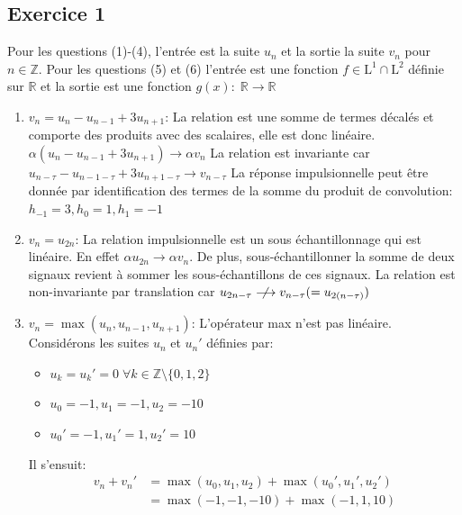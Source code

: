 \subsection*{Exercice 1}
Pour les questions (1)-(4), l'entrée est la suite $u_n$ et la sortie la suite $v_n$ pour $n \in \mathbb{Z}$. \newline
Pour les questions (5) et (6) l'entrée est une fonction $f \in \mathrm{L}^1 \cap \mathrm{L}^2$ définie sur $\mathbb{R}$ et la sortie est une fonction $g(x): \; \mathbb{R} \rightarrow \mathbb{R}$
\begin{enumerate}
\item $v_n = u_n - u_{n-1} + 3u_{n+1}$: \newline
La relation est une somme de termes décalés et comporte des produits avec des scalaires, elle est donc linéaire. $\alpha(u_n - u_{n-1} + 3u_{n+1}) \rightarrow \alpha v_n$ \newline
La relation est invariante car $u_{n-\tau} - u_{n-1-\tau} + 3u_{n+1-\tau} \rightarrow v_{n-\tau}$ \newline
La réponse impulsionnelle peut être donnée par identification des termes de la somme du produit de convolution: $h_{-1} = 3, h_0 = 1, h_1 = -1$
\item $v_n = u_{2n}$: \newline
La relation impulsionnelle est un sous échantillonnage qui est linéaire. En effet $\alpha u_{2n} \rightarrow \alpha v_n$. De plus, sous-échantillonner la somme de deux signaux revient à sommer les sous-échantillons de ces signaux.
La relation est non-invariante par translation car $u_{2n-\tau} \centernot\longrightarrow v_{n-\tau} (=u_{2(n-\tau)})$
\item $v_n = \max(u_n, u_{n-1}, u_{n+1})$: \newline
L'opérateur max n'est pas linéaire. Considérons les suites $u_n$ et $u_n'$ définies par: \newline
\begin{itemize}
\item $u_k = u_k' = 0 \;\forall k \in \mathbb{Z} \setminus \{0, 1, 2\}$
\item $u_0 = -1, u_1 = -1, u_2 = -10 $
\item $u_0' = -1, u_1' = 1, u_2' = 10 $
\end{itemize}
Il s'ensuit: 
\begin{equation*}
\begin{split}
 v_n + v_n' &= \max(u_0, u_1, u_2) + \max(u_0', u_1', u_2') \\
			&= \max(-1, -1, -10) + \max(-1, 1, 10) \\

\end{split}
\end{equation*}
\end{enumerate}
